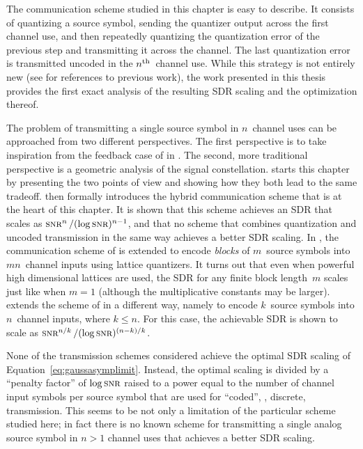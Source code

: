 The communication scheme studied in this chapter is easy to describe. It
consists of quantizing a source symbol, sending the quantizer output across the
first channel use, and then repeatedly quantizing the quantization error of the
previous step and transmitting it across the channel. The last quantization
error is transmitted uncoded in the $n{^{\text{th}}}$~channel use. While this strategy is
not entirely new (see  for references to previous work),
the work presented in this thesis provides the first exact analysis of the
resulting SDR scaling and the optimization thereof.

The problem of transmitting a single source symbol in $n$~channel uses can be
approached from two different perspectives. The first perspective is to take
inspiration from the feedback case of  in .
The second, more traditional perspective is a geometric analysis of the signal
constellation.   starts this chapter by presenting the
two points of view and showing how they both lead to the same tradeoff.
 then formally introduces the hybrid communication scheme
that is at the heart of this chapter. It is shown that this scheme achieves an
SDR that scales as $\snr^n / (\log\snr)^{n-1}$, and that no scheme that combines
quantization and uncoded transmission in the same way achieves a better SDR
scaling. In , the communication scheme of
 is extended to encode \emph{blocks} of $m$~source symbols
into $mn$~channel inputs using lattice quantizers. It turns out that even when
powerful high dimensional lattices are used, the SDR for any finite
block length~$m$ scales just like when $m = 1$ (although the multiplicative
constants may be larger).  extends the scheme of
 in a different way, namely to encode $k$~source symbols
into $n$~channel inputs, where $k \le n$. For this case, the achievable SDR is
shown to scale as $\snr^{n/k} /(\log\snr)^{(n-k)/k}$. 

None of the transmission schemes considered achieve the optimal SDR scaling of
Equation~\ref{eq:gaussasymplimit}. Instead, the optimal scaling is divided by a
``penalty factor'' of $\log\snr$ raised to a power equal to the number of
channel input symbols per source symbol that are used for ``coded'', \ie,
discrete, transmission. This seems to be not only a limitation of the particular
scheme studied here; in fact there is no known scheme for transmitting a
single analog source symbol in $n > 1$ channel uses that achieves a better SDR
scaling. 

